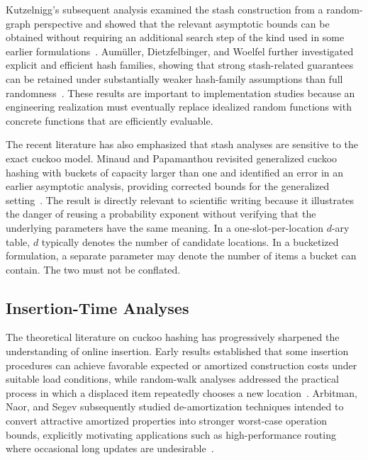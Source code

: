 \documentclass[conference]{IEEEtran}
\begin{document}
Kutzelnigg's subsequent analysis examined the stash construction from a random-graph perspective and showed that the relevant asymptotic bounds can be obtained without requiring an additional search step of the kind used in some earlier formulations~\cite{kutzelnigg2010stash}. Aum\"uller, Dietzfelbinger, and Woelfel further investigated explicit and efficient hash families, showing that strong stash-related guarantees can be retained under substantially weaker hash-family assumptions than full randomness~\cite{aumuller2014explicit}. These results are important to implementation studies because an engineering realization must eventually replace idealized random functions with concrete functions that are efficiently evaluable.

The recent literature has also emphasized that stash analyses are sensitive to the exact cuckoo model. Minaud and Papamanthou revisited generalized cuckoo hashing with buckets of capacity larger than one and identified an error in an earlier asymptotic analysis, providing corrected bounds for the generalized setting~\cite{minaud2023generalized}. The result is directly relevant to scientific writing because it illustrates the danger of reusing a probability exponent without verifying that the underlying parameters have the same meaning. In a one-slot-per-location $d$-ary table, $d$ typically denotes the number of candidate locations. In a bucketized formulation, a separate parameter may denote the number of items a bucket can contain. The two must not be conflated.

\subsection{Insertion-Time Analyses}

The theoretical literature on cuckoo hashing has progressively sharpened the understanding of online insertion. Early results established that some insertion procedures can achieve favorable expected or amortized construction costs under suitable load conditions, while random-walk analyses addressed the practical process in which a displaced item repeatedly chooses a new location~\cite{fountoulakis2010insertion}. Arbitman, Naor, and Segev subsequently studied de-amortization techniques intended to convert attractive amortized properties into stronger worst-case operation bounds, explicitly motivating applications such as high-performance routing where occasional long updates are undesirable~\cite{arbitman2009deamortized}.
\end{document}
